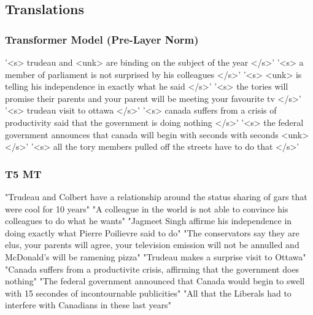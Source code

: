 \documentclass[11pt]{article}
\begin{document}
\subsection{Translations}

\subsubsection{Transformer Model (Pre-Layer Norm)}
'<s> trudeau and <unk> are binding on the subject of the year </s>'\newline
'<s> a member of parliament is not surprised by his colleagues </s>'\newline
'<s> <unk> is telling his independence in exactly what he said </s>'\newline
'<s> the tories will promise their parents and your parent will be meeting your favourite tv </s>'\newline
'<s> trudeau visit to ottawa </s>'\newline
'<s> canada suffers from a crisis of productivity said that the government is doing nothing </s>'\newline
'<s> the federal government announces that canada will begin with seconds with seconds <unk> </s>'\newline
'<s> all the tory members pulled off the streets have to do that </s>'

\subsubsection{T5 MT}
"Trudeau and Colbert have a relationship around the status sharing of gars that were cool for 10 years"\newline
"A colleague in the world is not able to convince his colleagues to do what he wants"\newline
"Jagmeet Singh affirme his independence in doing exactly what Pierre Poilievre said to do"\newline
"The conservators say they are elus, your parents will agree, your television emission will not be annulled and McDonald’s will be ramening pizza"\newline
"Trudeau makes a surprise visit to Ottawa"\newline
"Canada suffers from a productivite crisis, affirming that the government does nothing"\newline
"The federal government announced that Canada would begin to swell with 15 secondes of incontournable publicities"\newline
"All that the Liberals had to interfere with Canadians in these last years"
\end{document}
